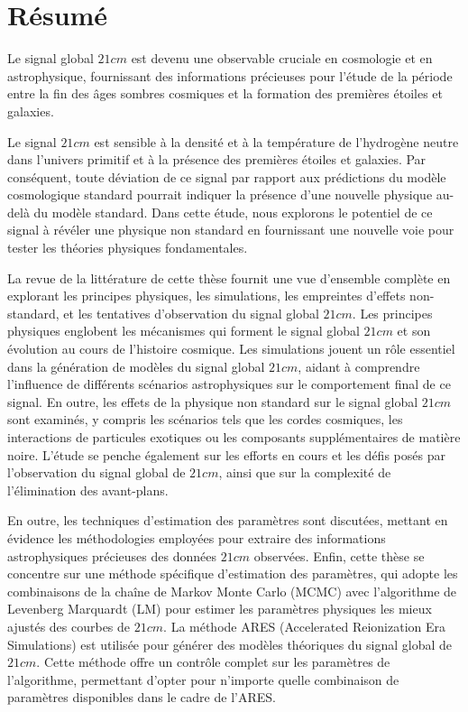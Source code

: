 \documentclass[12pt, TexShade, letterpaper]{report}
\begin{document}
\chapter*{Résumé}
	\label{chap:frAbstract}
Le signal global $21cm$ est devenu une observable cruciale en cosmologie et en astrophysique, fournissant des informations précieuses pour l'étude de la période entre la fin des âges sombres cosmiques et la formation des premières étoiles et galaxies.\par

Le signal $21cm$ est sensible à la densité et à la température de l'hydrogène neutre dans l'univers primitif et à la présence des premières étoiles et galaxies. Par conséquent, toute déviation de ce signal par rapport aux prédictions du modèle cosmologique standard pourrait indiquer la présence d'une nouvelle physique au-delà du modèle standard. Dans cette étude, nous explorons le potentiel de ce signal à révéler une physique non standard en fournissant une nouvelle voie pour tester les théories physiques fondamentales.\par 

La revue de la littérature de cette thèse fournit une vue d'ensemble complète en explorant les principes physiques, les simulations, les empreintes d'effets non-standard, et les tentatives d'observation du signal global $21cm$. Les principes physiques englobent les mécanismes qui forment le signal global $21cm$ et son évolution au cours de l'histoire cosmique. Les simulations jouent un rôle essentiel dans la génération de modèles du signal global $21cm$, aidant à comprendre l'influence de différents scénarios astrophysiques sur le comportement final de ce signal. En outre, les effets de la physique non standard sur le signal global $21cm$ sont examinés, y compris les scénarios tels que les cordes cosmiques, les interactions de particules exotiques ou les composants supplémentaires de matière noire. L'étude se penche également sur les efforts en cours et les défis posés par l'observation du signal global de $21cm$, ainsi que sur la complexité de l'élimination des avant-plans.\par

En outre, les techniques d'estimation des paramètres sont discutées, mettant en évidence les méthodologies employées pour extraire des informations astrophysiques précieuses des données $21cm$ observées. Enfin, cette thèse se concentre sur une méthode spécifique d'estimation des paramètres, qui adopte les combinaisons de la chaîne de Markov Monte Carlo (MCMC) avec l'algorithme de Levenberg Marquardt (LM) pour estimer les paramètres physiques les mieux ajustés des courbes de $21cm$. La méthode ARES (Accelerated Reionization Era Simulations) est utilisée pour générer des modèles théoriques du signal global de $21cm$. Cette méthode offre un contrôle complet sur les paramètres de l'algorithme, permettant d'opter pour n'importe quelle combinaison de paramètres disponibles dans le cadre de l'ARES.\par
\end{document}
